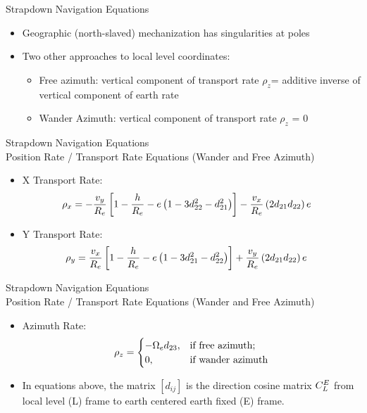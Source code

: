 \begin{frame}
Strapdown Navigation Equations\\
\begin{itemize}
  \item Geographic (north-slaved) mechanization has singularities at poles
  \item Two other approaches to local level coordinates:
  \begin{itemize}
	\item Free azimuth: vertical component of transport rate $\rho_z$= additive inverse of vertical component of earth rate
	\item Wander Azimuth:  vertical component of transport rate $\rho_z$ = 0
  \end{itemize}
\end{itemize} 
\end{frame}

\begin{frame}
Strapdown Navigation Equations\\
Position Rate / Transport Rate Equations (Wander and Free Azimuth)
\begin{itemize}
  \item X Transport Rate:
\begin{align}\label{xtrateeq}
\rho_x&=-\dfrac{v_y}{R_e}\left[1-\dfrac{h}{R_e}-e\left(1-3d_{22}^2-d_{21}^2\right)\right]-\dfrac{v_x}{R_e}\left(2d_{21}d_{22}\right)e
\end{align}  
  \item Y Transport Rate:
\begin{align}\label{ytrateeq}
\rho_y&=\dfrac{v_x}{R_e}\left[1-\dfrac{h}{R_e}-e\left(1-3d_{21}^2-d_{22}^2\right)\right]+\dfrac{v_y}{R_e}\left(2d_{21}d_{22}\right)e
\end{align}  
\end{itemize} 
\end{frame}

\begin{frame}
Strapdown Navigation Equations\\
Position Rate / Transport Rate Equations (Wander and Free Azimuth)
\begin{itemize}
  \item Azimuth Rate:
\[
\rho_z= 
\begin{cases} 
-\Omega_e d_{23}, &\text{if free azimuth;}\\ 
0,  &\text{if wander azimuth} 
\end{cases}
\]
  \item In equations above, the matrix $\left[d_{ij}\right]$ is the direction cosine matrix $C_{L}^{E}$ from local level (L) frame to earth centered earth fixed (E) frame.
\end{itemize} 
\end{frame}
